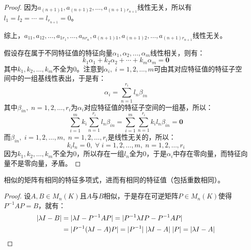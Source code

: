 \begin{proof}
	因为$a_{(n+1)1},a_{(n+1)2},\dots,a_{(n+1)r_{n+1}}$线性无关，所以有$l_1=l_2=\cdots=l_{r_{n+1}}=0$。\par
	综上，$a_{11},a_{12},\dots,a_{1r_1},\dots,a_{nr_n},a_{(n+1)1},a_{(n+1)2},\dots,a_{(n+1)r_{n+1}}$线性无关。\par
	假设存在属于不同特征值的特征向量$\alpha_1,\alpha_2,\dots,\alpha_m$线性相关，则有：
	\begin{equation*}
		k_1\alpha_1+k_2\alpha_2+\cdots+k_m\alpha_m=\mathbf{0}
	\end{equation*}
	其中$k_1,k_2,\dots,k_m$不全为$0$。注意到$\alpha_i,\;i=1,2,\dots,m$可由其对应特征值的特征子空间中的一组基线性表出，于是有：
	\begin{equation*}
		\alpha_i=\sum_{n=1}^{r_i}l_n\beta_{in}
	\end{equation*}
	其中$\beta_{in},\;n=1,2,\dots,r_i$为$\alpha_i$对应特征值的特征子空间的一组基，所以：
	\begin{equation*}
		\sum_{i=1}^{m}k_i\sum_{n=1}^{r_i}l_n\beta_{in}=	\sum_{i=1}^{m}\sum_{n=1}^{r_i}k_il_n\beta_{in}=\mathbf{0}
	\end{equation*}
	而$\beta_{in},\;i=1,2,\dots,m,\;n=1,2,\dots,r_i$是线性无关的，所以：
	\begin{equation*}
		k_il_n=0,\;\forall\;i=1,2,\dots,m,\;n=1,2,\dots,r_i
	\end{equation*}
	因为$k_1,k_2,\dots,k_m$不全为$0$，所以存在一组$l_n$全为$0$，于是$\alpha_i$中存在零向量，而特征向量不是零向量，矛盾。
\end{proof}
\begin{theorem}\label{theo:SameEigenvalue}
	相似的矩阵有相同的特征多项式，进而有相同的特征值（包括重数相同）。
\end{theorem}
\begin{proof}
	设$A,B\in M_{n}(K)$且$A$与$B$相似，于是存在可逆矩阵$P\in M_{n}(K)$使得$P^{-1}AP=B$，就有：
	\begin{align*}
		|\lambda I-B|
		&=|\lambda I-P^{-1}AP|=|P^{-1}\lambda IP-P^{-1}AP| \\
		&=|P^{-1}(\lambda I-A)P|=|P^{-1}|\;|\lambda I-A|\;|P|=|\lambda I-A|\qedhere
	\end{align*}
\end{proof}
